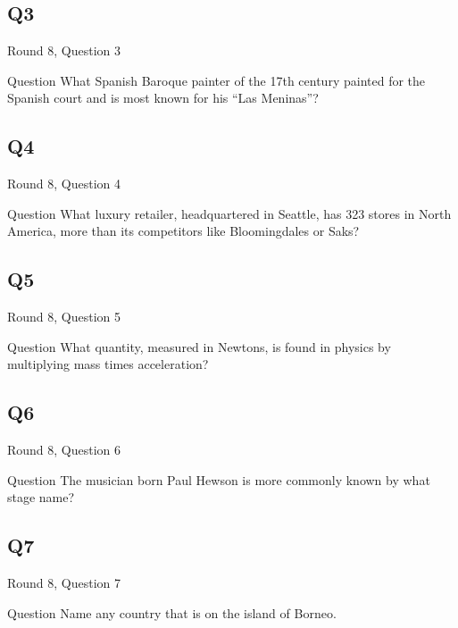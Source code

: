 \documentclass[11pt]{beamer}
\begin{document}
\subsection*{Q3}
\begin{frame}[t]{Round 8, Question 3}
\vspace{2em}
\begin{block}{Question}
What Spanish Baroque painter of the 17th century painted for the Spanish court and is most known for his ``Las Meninas''\@?
\end{block}
\end{frame}
    

\subsection*{Q4}
\begin{frame}[t]{Round 8, Question 4}
\vspace{2em}
\begin{block}{Question}
What luxury retailer, headquartered in Seattle, has 323 stores in North America, more than its competitors like Bloomingdales or Saks\@?
\end{block}
\end{frame}
    

\subsection*{Q5}
\begin{frame}[t]{Round 8, Question 5}
\vspace{2em}
\begin{block}{Question}
What quantity, measured in Newtons, is found in physics by multiplying mass times acceleration\@?
\end{block}
\end{frame}
    

\subsection*{Q6}
\begin{frame}[t]{Round 8, Question 6}
\vspace{2em}
\begin{block}{Question}
The musician born Paul Hewson is more commonly known by what stage name\@?
\end{block}
\end{frame}
    

\subsection*{Q7}
\begin{frame}[t]{Round 8, Question 7}
\vspace{2em}
\begin{block}{Question}
Name any country that is on the island of Borneo.
\end{block}
\end{frame}
    
\end{document}
